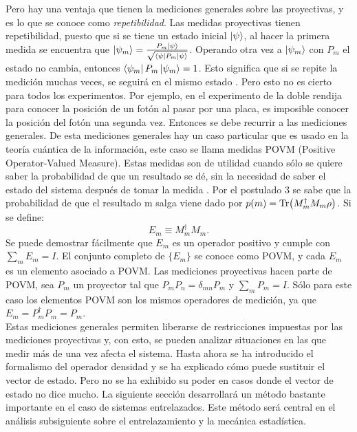 Pero hay una ventaja que tienen  la mediciones generales sobre las proyectivas, y es lo que se conoce como \textit{repetibilidad}. Las medidas proyectivas tienen repetibilidad, puesto que si se tiene un estado inicial $\ket{\psi}$, al hacer la primera medida se encuentra que $\ket{\psi_{m}}=\frac{P_{m}\ket{\psi}}{\sqrt{\bra{\psi}P_{m}\ket{\psi}}}$. Operando otra vez a $\ket{\psi_{m}}$ con $P_{m}$ el estado no cambia, entonces $\bra{\psi_{m}}P_{m}\ket{\psi_{m}}=1$. Esto significa que si se repite la medición muchas veces, se seguirá en el mismo estado \cite{VedralInformation}. Pero esto no es cierto para todos los experimentos. Por ejemplo, en el experimento de la doble rendija para conocer la posición de un fotón al pasar por una placa, es imposible conocer la posición del fotón una segunda vez. Entonces se debe recurrir a las mediciones generales. De esta mediciones generales hay un caso particular que es usado en la teoría cuántica de la información, este caso se llama medidas POVM (Positive Operator-Valued Measure). Estas medidas son de utilidad cuando sólo se quiere saber la probabilidad de que un resultado se dé, sin la necesidad de saber el estado del sistema después de tomar la medida \cite{NielsenInformation}. Por el postulado 3 se sabe que la probabilidad de que el resultado m salga viene dado por $p(m)= \Tr (M^{\dagger}_{m}M_{m} \rho)$. Si se define:
\begin{equation}
E_{m} \equiv M^{\dagger}_{m}M_{m}.
\end{equation}
Se puede demostrar fácilmente que $E_{m}$ es un operador positivo y cumple con $\sum_{m} E_{m}=I$. El conjunto completo de $ \{ E_{m}\}$ se conoce como POVM, y cada $E_{m}$ es un elemento asociado a POVM. Las mediciones proyectivas hacen parte de POVM, sea $P_{m}$ un proyector tal que $P_{m}P_{n}= \delta_{mn}P_{m}$ y $\sum_{m}P_{m}=I$. Sólo para este caso los elementos POVM son los mismos operadores de medición, ya que $E_{m}=P_{m}^{\dagger}P_{m}=P_{m}$.
\\
Estas mediciones generales permiten liberarse de restricciones impuestas por las mediciones proyectivas y, con esto, se pueden analizar situaciones en las que medir más de una vez afecta el sistema. Hasta ahora se ha introducido el formalismo del operador densidad y se ha explicado cómo puede sustituir el vector de estado. Pero no se ha exhibido su poder en casos donde el vector de estado no dice mucho. La siguiente sección desarrollará un método bastante importante en el caso de sistemas entrelazados. Este método será central en el análisis subsiguiente sobre el entrelazamiento y la mecánica estadística.

